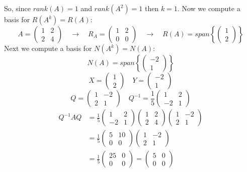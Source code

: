 So, since $rank(A) = 1$ and $rank(A^2) = 1$ then $k = 1$.
Now we compute a basis for $R(A^k) = R(A)$:
\[
    A = \begin{pmatrix}
    1 & 2 \\
    2 & 4
    \end{pmatrix} \quad \rightarrow \quad
    R_A = \begin{pmatrix}
    1 & 2 \\
    0 & 0
    \end{pmatrix} \quad \rightarrow \quad
    R(A) = span{\left\{ \begin{pmatrix} 1 \\ 2 \end{pmatrix} \right\}}
\]
Next we compute a basis for $N(A^k) = N(A)$:
\[ N(A) = span{\left\{ \begin{pmatrix} -2 \\ 1 \end{pmatrix} \right\}} \]
\[ X = \begin{pmatrix} 1 \\ 2 \end{pmatrix} \quad Y = \begin{pmatrix} -2 \\ 1 \end{pmatrix} \]
\[
    Q = \begin{pmatrix} 1 & -2 \\ 2 & 1 \end{pmatrix}
    \quad Q^{-1} = \frac{1}{5} \begin{pmatrix} 1 & 2 \\ -2 & 1 \end{pmatrix}
\]
\newline
\[
    \begin{aligned}
        Q^{-1} A Q
        &=
        \frac{1}{5} \begin{pmatrix} 1 & 2 \\ -2 & 1 \end{pmatrix}
        \begin{pmatrix} 1 & 2 \\ 2 & 4 \end{pmatrix}
        \begin{pmatrix} 1 & -2 \\ 2 & 1 \end{pmatrix} \\
        &=
        \frac{1}{5} \begin{pmatrix} 5 & 10 \\ 0 & 0 \end{pmatrix}
        \begin{pmatrix} 1 & -2 \\ 2 & 1 \end{pmatrix}  \\
        &=
        \frac{1}{5} \begin{pmatrix} 25 & 0 \\ 0 & 0 \end{pmatrix}
        = \begin{pmatrix} 5 & 0 \\ 0 & 0 \end{pmatrix}
    \end{aligned}
\]

